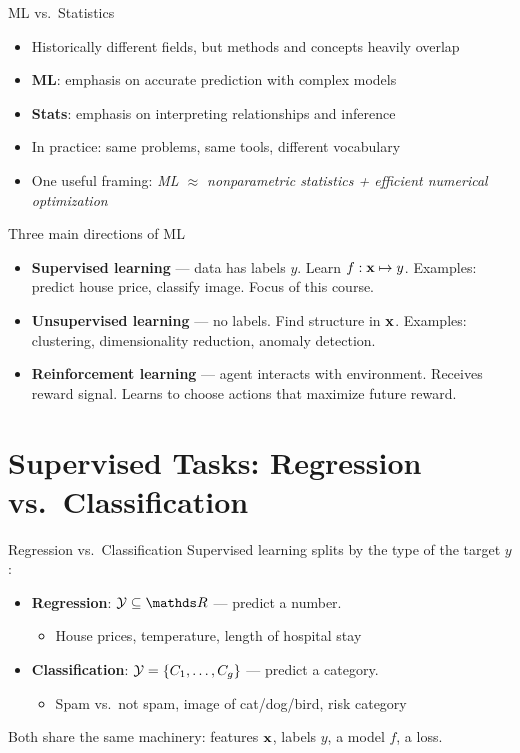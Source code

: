 \documentclass[aspectratio=169]{beamer}
\begin{document}
\begin{frame}{ML vs.\ Statistics}
  \begin{itemize}
    \item Historically different fields, but methods and concepts heavily overlap
    \item \textbf{ML}: emphasis on accurate prediction with complex models
    \item \textbf{Stats}: emphasis on interpreting relationships and inference
    \item In practice: same problems, same tools, different vocabulary
    \item One useful framing: \emph{ML $\approx$ nonparametric statistics + efficient numerical optimization}
  \end{itemize}
\end{frame}

\begin{frame}{Three main directions of ML}
  \begin{itemize}
    \item \textbf{Supervised learning} — data has labels $y$. Learn $f: \mathbf{x} \mapsto y$. Examples: predict house price, classify image. \textcolor{popblue}{Focus of this course.}
    \item \textbf{Unsupervised learning} — no labels. Find structure in $\mathbf{x}$. Examples: clustering, dimensionality reduction, anomaly detection.
    \item \textbf{Reinforcement learning} — agent interacts with environment. Receives reward signal. Learns to choose actions that maximize future reward.
  \end{itemize}
\end{frame}

\section{Supervised Tasks: Regression vs.\ Classification}

\begin{frame}{Regression vs.\ Classification}
  Supervised learning splits by the type of the target $y$:
  \vfill
  \begin{itemize}
    \item \textbf{Regression}: $\Yspace \subseteq \R$ — predict a number.
      \begin{itemize}
        \item House prices, temperature, length of hospital stay
      \end{itemize}
    \item \textbf{Classification}: $\mathcal{Y} = \{C_1, \dots, C_g\}$ — predict a category.
      \begin{itemize}
        \item Spam vs.\ not spam, image of cat/dog/bird, risk category
      \end{itemize}
  \end{itemize}
  \vfill
  Both share the same machinery: features $\mathbf{x}$, labels $y$, a model $f$, a loss.
\end{frame}
\end{document}
